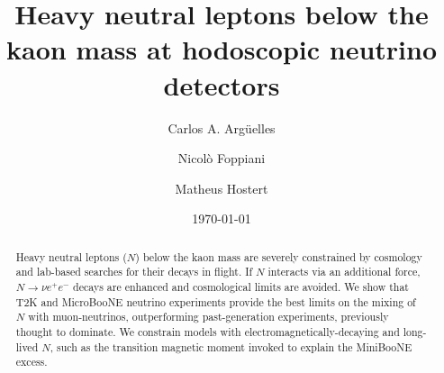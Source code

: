 \documentclass[
reprint,
superscriptaddress,
showpacs,
preprintnumbers,
bibnotes,
amsmath,
amssymb,
aps,
prd,
floatfix
]{revtex4-2}
\begin{document}

\title{Heavy neutral leptons below the kaon mass at hodoscopic neutrino detectors}

\author{Carlos A. Arg{\"u}elles}

\author{Nicol\`o Foppiani}

\author{Matheus Hostert}

\date{\today}

\begin{abstract}
Heavy neutral leptons ($N$) below the kaon mass are severely constrained by cosmology and lab-based searches for their decays in flight.
If $N$ interacts via an additional force, $N\to\nu e^+e^-$ decays are enhanced and cosmological limits are avoided.
We show that T2K and MicroBooNE neutrino experiments provide the best limits on the mixing of $N$ with muon-neutrinos, outperforming past-generation experiments, previously thought to dominate.
We constrain models with electromagnetically-decaying and long-lived $N$, such as the transition magnetic moment invoked to explain the MiniBooNE excess.
\end{abstract}

\maketitle
\end{document}
